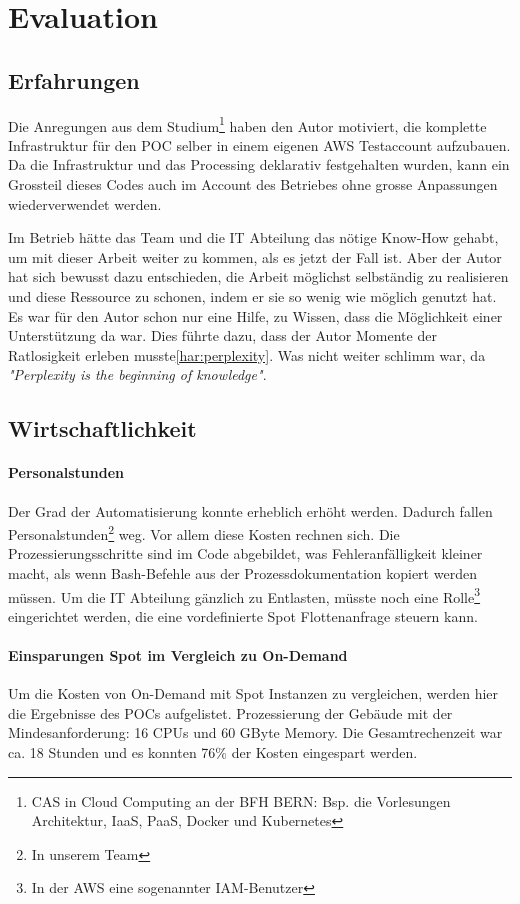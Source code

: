 \section{Evaluation}
\subsection{Erfahrungen}
Die Anregungen aus dem Studium\footnote{CAS in Cloud Computing an der BFH BERN: Bsp. die Vorlesungen Architektur, IaaS, PaaS, Docker und Kubernetes} haben den Autor motiviert, die komplette Infrastruktur für den POC selber in einem eigenen AWS Testaccount aufzubauen. Da die Infrastruktur und das Processing deklarativ festgehalten wurden, kann ein Grossteil dieses Codes auch im Account des Betriebes ohne grosse Anpassungen wiederverwendet werden.

Im Betrieb hätte das Team und die IT Abteilung das nötige Know-How gehabt, um mit dieser Arbeit weiter zu kommen, als es jetzt der Fall ist. Aber der Autor hat sich bewusst dazu entschieden, die Arbeit möglichst selbständig zu realisieren und  diese Ressource zu schonen, indem er sie so wenig wie möglich genutzt hat. Es war für den Autor schon nur eine Hilfe, zu Wissen, dass die Möglichkeit einer Unterstützung da war. Dies führte dazu, dass der Autor Momente der Ratlosigkeit erleben musste\ref{har:perplexity}. Was nicht weiter schlimm war, da \textit{"Perplexity is the beginning of knowledge"}\autocite[33]{CloudNativ:1}.

\subsection{Wirtschaftlichkeit}
\paragraph{Personalstunden}
Der Grad der Automatisierung konnte erheblich erhöht werden. Dadurch fallen Personalstunden\footnote{In unserem Team} weg. Vor allem diese Kosten rechnen sich. Die Prozessierungsschritte sind im Code abgebildet, was Fehleranfälligkeit kleiner macht, als wenn Bash-Befehle aus der Prozessdokumentation kopiert werden müssen. Um die IT Abteilung gänzlich zu Entlasten, müsste noch eine Rolle\footnote{In der AWS eine sogenannter IAM-Benutzer} eingerichtet werden, die eine vordefinierte Spot Flottenanfrage steuern kann.
\paragraph{Einsparungen Spot im Vergleich zu On-Demand}
Um die Kosten von On-Demand mit Spot Instanzen zu vergleichen, werden hier die Ergebnisse des POCs aufgelistet. Prozessierung der Gebäude mit der Mindesanforderung: 16 CPUs und 60 GByte Memory. Die Gesamtrechenzeit war ca. 18 Stunden und es konnten 76\% der Kosten eingespart werden.


